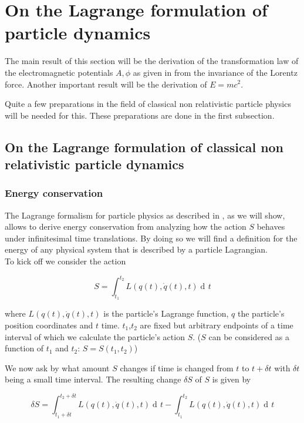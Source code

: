 \documentclass{article}
\DeclareMathOperator{\dd}{d\!}
\begin{document}
\section{On the Lagrange formulation of particle dynamics} \label{particleLagrangian}

The main result of this section will be the derivation of the transformation law of the electromagnetic potentials $A,\phi$ as given in \cite{LagrangeOfField} from the invariance of the Lorentz force.
Another important result will be the derivation of $E=mc^2$.

Quite a few preparations in the field of classical non relativistic particle physics will be needed for this.
These preparations are done in the first subsection.

\subsection{On the Lagrange formulation of classical non relativistic particle dynamics}

\subsubsection{Energy conservation} \label{energyConservation}
The Lagrange formalism for particle physics as described in \cite{WagnerGuthrie}, as we will show, allows to derive energy conservation from analyzing how the action $S$ behaves under infinitesimal time translations. 
By doing so we will find a definition for the energy of any physical system that is described by a particle Lagrangian. \\

To kick off we consider the action

\begin{equation}
S = \int_{t_1}^{t_2} L(q(t), \dot{q}(t), t) \dd t
\end{equation}

where $L(q(t), \dot{q}(t), t)$ is the particle's Lagrange function, $q$ the particle's position coordinates and $t$ time. $t_1$,$t_2$ are fixed but arbitrary endpoints of a time interval of which we calculate the particle's action $S$. 
($S$ can be considered as a function of $t_1$ and $t_2$: $S = S(t_1,t_2)$)

We now ask by what amount $S$ changes if time is changed from $t$ to $t + \delta t$ with $\delta t$ being a small time interval.
The resulting change $\delta S$ of $S$ is given by

\begin{equation} \label{defDelS}
\delta S = \int_{t_1 + \delta t}^{t_2 + \delta t} L(q(t), \dot{q}(t), t) \dd t 
- \int_{t_1}^{t_2} L(q(t), \dot{q}(t), t) \dd t
\end{equation}
\end{document}
